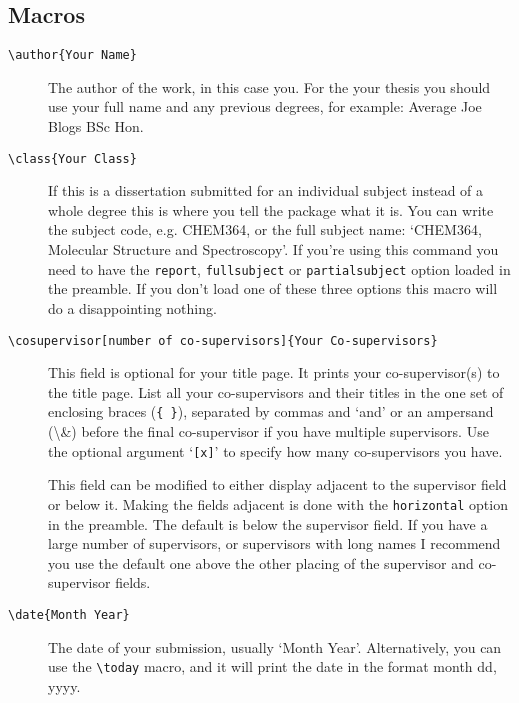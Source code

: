\documentclass[12pt,oneside]{article}
\newcommand{\option}[1]{\texttt{\color{Green}#1}} %
\newcommand{\command}[1]{\texttt{\color{Red}#1}} %
\newcommand{\comoptions}[1]{\texttt{\color{Blue}#1}} %
\begin{document}
\subsection*{Macros}
\begin{description}
    \item[\command{\textbackslash{}author}\comoptions{\{Your Name\}}]
    The author of the work, in this case you. For the your thesis you should use your full name and any previous degrees, for example: Average Joe Blogs BSc Hon.
    
    \item[\command{\textbackslash{}class}\comoptions{\{Your Class\}}] If this is a dissertation submitted for an individual subject instead of a whole degree this is where you tell the package what it is. You can write the subject code, e.g. CHEM364, or the full subject name: `CHEM364, Molecular Structure and Spectroscopy'. If you're using this command you need to have the \option{report}, \option{fullsubject} or \option{partialsubject} option loaded in the preamble. If you don't load one of these three options this macro will do a disappointing nothing.
    
    \item[\command{\textbackslash{}cosupervisor}\option{[number of co-supervisors]}\comoptions{\{Your Co-supervisors\}}] This field is optional for your title page. It prints your co-super\-visor(s) to the title page. List all your co-supervisors and their titles in the one set of enclosing braces (\comoptions{\{~\}}), separated by commas and `and' or an ampersand (\textbackslash{}\&) before the final co-supervisor if you have multiple supervisors. Use the optional argument `\option{[x]}' to specify how many co-supervisors you have.
    
    This field can be modified to either display adjacent to the supervisor field or below it. Making the fields adjacent is done with the \option{horizontal} option in the preamble. The default is below the supervisor field. If you have a large number of supervisors, or supervisors with long names I recommend you use the default one above the other placing of the supervisor and co-supervisor fields.
    
    \item[\command{\textbackslash{}date}\comoptions{\{Month Year\}}] The date of your submission, usually `Month Year'. Alternatively, you can use the \command{\textbackslash{}today} macro, and it will print the date in the format month dd, yyyy.
    

\end{description}
\end{document}

